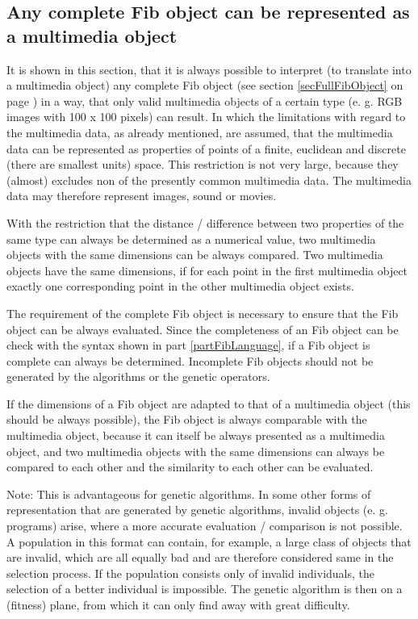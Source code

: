 \subsection{Any complete Fib object can be represented as a multimedia object}
\label{alleBilder}

It is shown in this section, that it is always possible to interpret (to translate into a multimedia object) any complete Fib object (see section \ref{secFullFibObject} on page \pageref{secFullFibObject}) in a way, that only valid multimedia objects of a certain type (e. g. RGB images with 100 x 100 pixels) can result. In which the limitations with regard to the multimedia data, as already mentioned, are assumed, that the multimedia data can be represented as properties of points of a finite, euclidean and discrete (there are smallest units) space. This restriction is not very large, because they (almost) excludes non of the presently common multimedia data. The multimedia data may therefore represent images, sound or movies.

With the restriction that the distance / difference between two properties of the same type can always be determined as a numerical value, two multimedia objects with the same dimensions can be always compared. Two multimedia objects have the same dimensions, if for each point in the first multimedia object exactly one corresponding point in the other multimedia object exists.

The requirement of the complete Fib object is necessary to ensure that the Fib object can be always evaluated. Since the completeness of an Fib object can be check with the syntax shown in part \ref{partFibLanguage}, if a Fib object is complete can always be determined. Incomplete Fib objects should not be generated by the algorithms or the genetic operators.

If the dimensions of a Fib object are adapted to that of a multimedia object (this should be always possible), the Fib object is always comparable with the multimedia object, because it can itself be always presented as a multimedia object, and two multimedia objects with the same dimensions can always be compared to each other and the similarity to each other can be evaluated.

Note: This is advantageous for genetic algorithms. In some other forms of representation that are generated by genetic algorithms, invalid objects (e. g. programs) arise, where a more accurate evaluation / comparison is not possible. A population in this format can contain, for example, a large class of objects that are invalid, which are all equally bad and are therefore considered same in the selection process. If the population consists only of invalid individuals, the selection of a better individual is impossible. The genetic algorithm is then on a (fitness) plane, from which it can only find away with great difficulty.

